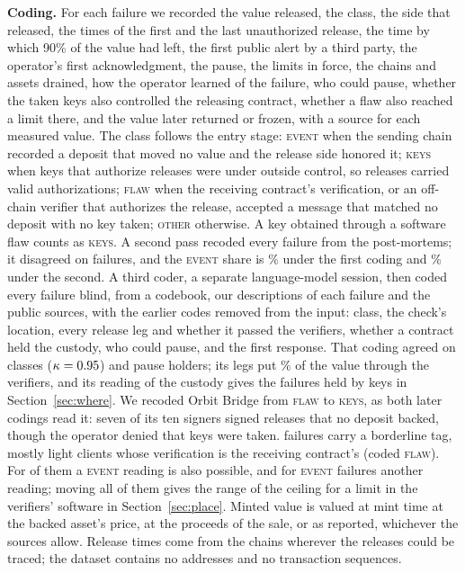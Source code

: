 \documentclass[conference,compsoc]{IEEEtran}
\numberwithin{equation}{section}
\theoremstyle{plain}
\theoremstyle{definition}
\theoremstyle{remark}
\newcommand{\runin}[1]{\par\smallskip\noindent\textbf{#1.}\enspace}
\newcommand{\cev}{\textsc{event}}
\newcommand{\ckeys}{\textsc{keys}}
\newcommand{\ccheck}{\textsc{flaw}}
\newcommand{\cother}{\textsc{other}}
\begin{document}
\runin{Coding} For each failure we recorded the value released, the class, the side that released, the times of the first and the last unauthorized release, the time by which 90\% of the value had left, the first public alert by a third party, the operator's first acknowledgment, the pause, the limits in force, the chains and assets drained, how the operator learned of the failure, who could pause, whether the taken keys also controlled the releasing contract, whether a flaw also reached a limit there, and the value later returned or frozen, with a source for each measured value. The class follows the entry stage: \cev{} when the sending chain recorded a deposit that moved no value and the release side honored it; \ckeys{} when keys that authorize releases were under outside control, so releases carried valid authorizations; \ccheck{} when the receiving contract's verification, or an off-chain verifier that authorizes the release, accepted a message that matched no deposit with no key taken; \cother{} otherwise. A key obtained through a software flaw counts as \ckeys{}. A second pass recoded every failure from the post-mortems; it disagreed on \nSecondDisagreeWords{} failures, and the \cev{} share is \classSExactPct\% under the first coding and \classSRecodedPct\% under the second. A third coder, a separate language-model session, then coded every failure blind, from a codebook, our descriptions of each failure and the public sources, with the earlier codes removed from the input: class, the check's location, every release leg and whether it passed the verifiers, whether a contract held the custody, who could pause, and the first response. That coding agreed on \blindAgree{} classes ($\kappa = 0.95$) and \blindPauseAgree{} pause holders; its legs put \blindVerifierPct\% of the value through the verifiers, and its reading of the custody gives the \keysHeldN{} failures held by keys in Section~\ref{sec:where}. We recoded Orbit Bridge from \ccheck{} to \ckeys{}, as both later codings read it: seven of its ten signers signed releases that no deposit backed, though the operator denied that keys were taken. \nBorderline{} failures carry a borderline tag, mostly light clients whose verification is the receiving contract's (coded \ccheck{}). For \nSPossible{} of them a \cev{} reading is also possible, and for \nSDoubt{} \cev{} failures another reading; moving all of them gives the range of the ceiling for a limit in the verifiers' software in Section~\ref{sec:place}. Minted value is valued at mint time at the backed asset's price, at the proceeds of the sale, or as reported, whichever the sources allow. Release times come from the chains wherever the releases could be traced; the dataset contains no addresses and no transaction sequences.
\end{document}
